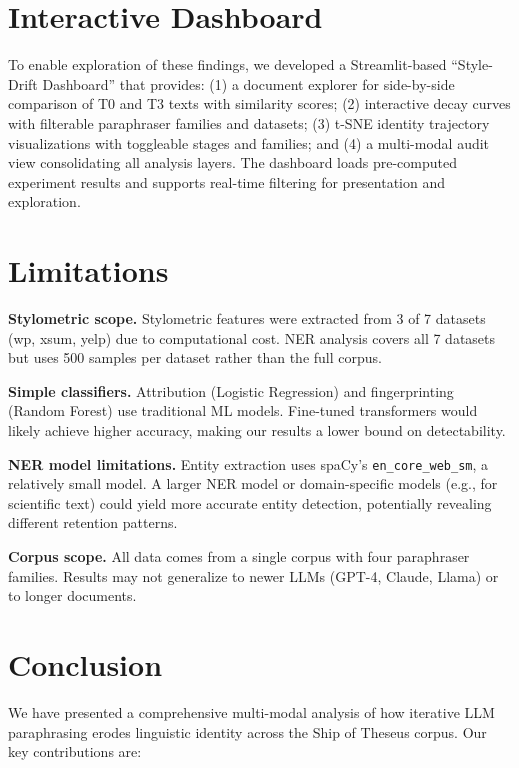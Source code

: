 \documentclass[10pt,twocolumn]{article}
\begin{document}
\section{Interactive Dashboard}

To enable exploration of these findings, we developed a Streamlit-based
``Style-Drift Dashboard'' that provides: (1) a document explorer for
side-by-side comparison of T0 and T3 texts with similarity scores; (2)
interactive decay curves with filterable paraphraser families and datasets;
(3) t-SNE identity trajectory visualizations with toggleable stages and
families; and (4) a multi-modal audit view consolidating all analysis
layers. The dashboard loads pre-computed experiment results and supports
real-time filtering for presentation and exploration.

\section{Limitations}

\textbf{Stylometric scope.} Stylometric features were extracted from
3 of 7 datasets (wp, xsum, yelp) due to computational cost. NER analysis
covers all 7 datasets but uses 500 samples per dataset rather than the
full corpus.

\textbf{Simple classifiers.} Attribution (Logistic Regression) and
fingerprinting (Random Forest) use traditional ML models. Fine-tuned
transformers would likely achieve higher accuracy, making our results
a lower bound on detectability.

\textbf{NER model limitations.} Entity extraction uses spaCy's
\texttt{en\_core\_web\_sm}, a relatively small model. A larger NER model
or domain-specific models (e.g., for scientific text) could yield more
accurate entity detection, potentially revealing different retention
patterns.

\textbf{Corpus scope.} All data comes from a single corpus
\cite{tripto2024} with four paraphraser families. Results may not
generalize to newer LLMs (GPT-4, Claude, Llama) or to longer documents.

\section{Conclusion}

We have presented a comprehensive multi-modal analysis of how iterative
LLM paraphrasing erodes linguistic identity across the Ship of Theseus
corpus. Our key contributions are:
\end{document}
